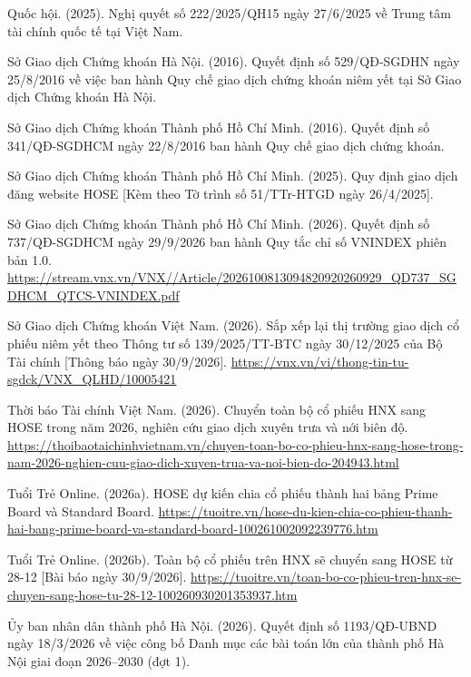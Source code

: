 \begin{list}{}{\setlength{\leftmargin}{1.5em}\setlength{\itemindent}{-1.5em}\setlength{\itemsep}{2pt}\small}
\item Quốc hội. (2025). Nghị quyết số 222/2025/QH15 ngày 27/6/2025 về Trung tâm tài chính quốc tế tại Việt Nam.
\item Sở Giao dịch Chứng khoán Hà Nội. (2016). Quyết định số 529/QĐ-SGDHN ngày 25/8/2016 về việc ban hành Quy chế giao dịch chứng khoán niêm yết tại Sở Giao dịch Chứng khoán Hà Nội.
\item Sở Giao dịch Chứng khoán Thành phố Hồ Chí Minh. (2016). Quyết định số 341/QĐ-SGDHCM ngày 22/8/2016 ban hành Quy chế giao dịch chứng khoán.
\item Sở Giao dịch Chứng khoán Thành phố Hồ Chí Minh. (2025). Quy định giao dịch đăng website HOSE [Kèm theo Tờ trình số 51/TTr-HTGD ngày 26/4/2025].
\item Sở Giao dịch Chứng khoán Thành phố Hồ Chí Minh. (2026). Quyết định số 737/QĐ-SGDHCM ngày 29/9/2026 ban hành Quy tắc chỉ số VNINDEX phiên bản 1.0. \url{https://stream.vnx.vn/VNX//Article/2026100813094820920260929_QD737_SGDHCM_QTCS-VNINDEX.pdf}
\item Sở Giao dịch Chứng khoán Việt Nam. (2026). Sắp xếp lại thị trường giao dịch cổ phiếu niêm yết theo Thông tư số 139/2025/TT-BTC ngày 30/12/2025 của Bộ Tài chính [Thông báo ngày 30/9/2026]. \url{https://vnx.vn/vi/thong-tin-tu-sgdck/VNX_QLHD/10005421}
\item Thời báo Tài chính Việt Nam. (2026). Chuyển toàn bộ cổ phiếu HNX sang HOSE trong năm 2026, nghiên cứu giao dịch xuyên trưa và nới biên độ. \url{https://thoibaotaichinhvietnam.vn/chuyen-toan-bo-co-phieu-hnx-sang-hose-trong-nam-2026-nghien-cuu-giao-dich-xuyen-trua-va-noi-bien-do-204943.html}
\item Tuổi Trẻ Online. (2026a). HOSE dự kiến chia cổ phiếu thành hai bảng Prime Board và Standard Board. \url{https://tuoitre.vn/hose-du-kien-chia-co-phieu-thanh-hai-bang-prime-board-va-standard-board-100261002092239776.htm}
\item Tuổi Trẻ Online. (2026b). Toàn bộ cổ phiếu trên HNX sẽ chuyển sang HOSE từ 28-12 [Bài báo ngày 30/9/2026]. \url{https://tuoitre.vn/toan-bo-co-phieu-tren-hnx-se-chuyen-sang-hose-tu-28-12-100260930201353937.htm}
\item Ủy ban nhân dân thành phố Hà Nội. (2026). Quyết định số 1193/QĐ-UBND ngày 18/3/2026 về việc công bố Danh mục các bài toán lớn của thành phố Hà Nội giai đoạn 2026–2030 (đợt 1).
\end{list}
